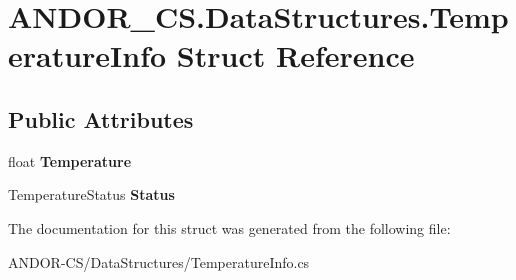\hypertarget{struct_a_n_d_o_r___c_s_1_1_data_structures_1_1_temperature_info}{}\section{A\+N\+D\+O\+R\+\_\+\+C\+S.\+Data\+Structures.\+Temperature\+Info Struct Reference}
\label{struct_a_n_d_o_r___c_s_1_1_data_structures_1_1_temperature_info}
\subsection*{Public Attributes}
\begin{DoxyCompactItemize}
\item 
\mbox{\label{struct_a_n_d_o_r___c_s_1_1_data_structures_1_1_temperature_info_a3a7e384ebf9bb04cec2057535f60aca4}} 
float {\bfseries Temperature}
\item 
\mbox{\label{struct_a_n_d_o_r___c_s_1_1_data_structures_1_1_temperature_info_a7a37d401072e056579cde324123f3987}} 
Temperature\+Status {\bfseries Status}
\end{DoxyCompactItemize}


The documentation for this struct was generated from the following file\+:\begin{DoxyCompactItemize}
\item 
A\+N\+D\+O\+R-\/\+C\+S/\+Data\+Structures/Temperature\+Info.\+cs\end{DoxyCompactItemize}
